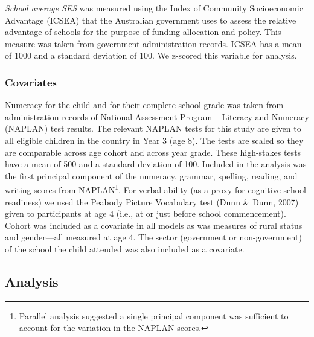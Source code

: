 \documentclass[
  english,
  man]{apa6}
\begin{document}
\emph{School average SES} was measured using the Index of Community Socioeconomic Advantage (ICSEA) that the Australian government uses to assess the relative advantage of schools for the purpose of funding allocation and policy. This measure was taken from government administration records. ICSEA has a mean of 1000 and a standard deviation of 100. We z-scored this variable for analysis.

\hypertarget{covariates}{%
\subsubsection{Covariates}\label{covariates}}

Numeracy for the child and for their complete school grade was taken from administration records of National Assessment Program -- Literacy and Numeracy (NAPLAN) test results. The relevant NAPLAN tests for this study are given to all eligible children in the country in Year 3 (age 8). The tests are scaled so they are comparable across age cohort and across year grade. These high-stakes tests have a mean of 500 and a standard deviation of 100. Included in the analysis was the first principal component of the numeracy, grammar, spelling, reading, and writing scores from NAPLAN\footnote{Parallel analysis suggested a single principal component was sufficient to account for the variation in the NAPLAN scores.}. For verbal ability (as a proxy for cognitive school readiness) we used the Peabody Picture Vocabulary test (Dunn \& Dunn, 2007) given to participants at age 4 (i.e., at or just before school commencement). Cohort was included as a covariate in all models as was measures of rural status and gender---all measured at age 4. The sector (government or non-government) of the school the child attended was also included as a covariate.

\hypertarget{analysis}{%
\subsection{Analysis}\label{analysis}}
\end{document}

